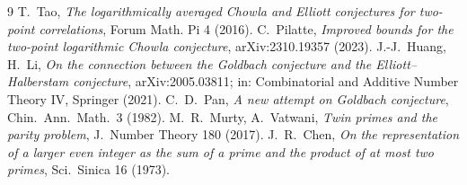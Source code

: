 \documentclass[11pt]{article}
\theoremstyle{definition}
\begin{document}
\begin{thebibliography}{9}
 T.~Tao, \emph{The logarithmically averaged Chowla and Elliott conjectures for two-point correlations}, Forum Math. Pi 4 (2016).
 C.~Pilatte, \emph{Improved bounds for the two-point logarithmic Chowla conjecture}, arXiv:2310.19357 (2023).
 J.-J.~Huang, H.~Li, \emph{On the connection between the
Goldbach conjecture and the Elliott--Halberstam conjecture},
arXiv:2005.03811; in: Combinatorial and Additive Number Theory IV,
Springer (2021).
 C.~D.~Pan, \emph{A new attempt on Goldbach conjecture},
Chin.\ Ann.\ Math.\ 3 (1982).
 M.~R.~Murty, A.~Vatwani, \emph{Twin primes and the parity
problem}, J.\ Number Theory 180 (2017).
 J.~R.~Chen, \emph{On the representation of a larger even
integer as the sum of a prime and the product of at most two primes},
Sci.\ Sinica 16 (1973).
\end{thebibliography}
\end{document}
